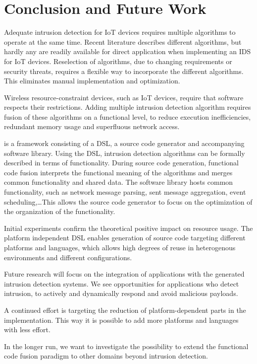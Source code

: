\documentclass[conference]{IEEEtran}
\begin{document}
\section{Conclusion and Future Work}
\label{conclusion}

Adequate intrusion detection for IoT devices requires multiple algorithms to
operate at the same time. Recent literature describes different algorithms, but
hardly any are readily available for direct application when implementing an
IDS for IoT devices. Reselection of algorithms, due to changing requirements or
security threats, requires a flexible way to incorporate the different
algorithms. This eliminates manual implementation and optimization.

Wireless resource-constraint devices, such as IoT devices, require that
software respects their restrictions. Adding multiple intrusion detection
algorithm requires fusion of these algorithms on a functional level, to reduce
execution inefficiencies, redundant memory usage and superfluous network access.

\NAME is a framework consisting of a DSL, a source code generator and
accompanying software library. Using the DSL, intrusion detection algorithms
can be formally described in terms of functionality. During source code
generation, functional code fusion interprets the functional meaning of the
algorithms and merges common functionality and shared data. The software
library hosts common functionality, such as network message parsing, sent
message aggregation, event scheduling,\dots This allows the source code
generator to focus on the optimization of the organization of the functionality.

Initial experiments confirm the theoretical positive impact on resource usage.
The platform independent DSL enables generation of source code targeting
different platforms and languages, which allows high degrees of reuse in
heterogenous environments and different configurations.

Future research will focus on the integration of applications with the
generated intrusion detection systems. We see opportunities for applications
who detect intrusion, to actively and dynamically respond and avoid malicious
payloads.

A continued effort is targeting the reduction of platform-dependent parts in
the implementation. This way it is possible to add more platforms and languages
with less effort.

In the longer run, we want to investigate the possibility to extend the
functional code fusion paradigm to other domains beyond intrusion detection.
\end{document}

